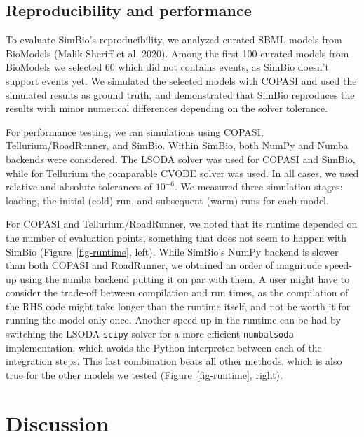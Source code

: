 \documentclass[
  letterpaper,
  DIV=11,
  numbers=noendperiod]{scrartcl}
\begin{document}


\hypertarget{reproducibility-and-performance}{%
\subsection{Reproducibility and
performance}\label{reproducibility-and-performance}}



To evaluate SimBio's reproducibility, we analyzed curated \ac{SBML} models
from BioModels (Malik-Sheriff et al. 2020). Among the first 100 curated
models from BioModels we selected 60 which did not contains events, as
SimBio doesn't support events yet. We simulated the selected models with
COPASI and used the simulated results as ground truth, and demonstrated
that SimBio reproduces the results with minor numerical differences
depending on the solver tolerance.

For performance testing, we ran simulations using COPASI,
Tellurium/RoadRunner, and SimBio. Within SimBio, both NumPy and Numba
backends were considered. The LSODA solver was used for COPASI and
SimBio, while for Tellurium the comparable CVODE solver was used. In all
cases, we used relative and absolute tolerances of \(10^{-6}\). We
measured three simulation stages: loading, the initial (cold) run, and
subsequent (warm) runs for each model.

For COPASI and Tellurium/RoadRunner, we noted that its runtime depended
on the number of evaluation points, something that does not seem to
happen with SimBio (Figure~\ref{fig-runtime}, left). While SimBio's
NumPy backend is slower than both COPASI and RoadRunner, we obtained an
order of magnitude speed-up using the numba backend putting it on par
with them. A user might have to consider the trade-off between
compilation and run times, as the compilation of the
\ac{RHS} code might take longer than the runtime itself, and not be worth
it for running the model only once. Another speed-up in the runtime can
be had by switching the LSODA \texttt{scipy} solver for a more efficient
\texttt{numbalsoda} implementation, which avoids the Python interpreter
between each of the integration steps. This last combination beats all
other methods, which is also true for the other models we tested
(Figure~\ref{fig-runtime}, right).

\hypertarget{discussion}{%
\section{Discussion}\label{discussion}}
\end{document}
